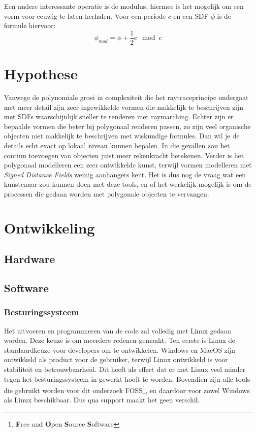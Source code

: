 \documentclass[12pt, a4paper]{article}
\begin{document}
Een andere interessante operatie is de modulus, hiermee is het mogelijk om een vorm voor eeuwig te laten herhalen. Voor een periode $c$ en een SDF $\phi$ is de formule hiervoor:
\[\phi_{mod}= \phi +\frac{1}{2}c\mod{c}\]

\clearpage
\section{Hypothese}
Vanwege de polynomiale groei in complexiteit die het raytraceprincipe ondergaat met meer detail zijn zeer ingewikkelde vormen die makkelijk te beschrijven zijn met SDFs waarschijnlijk sneller te renderen met raymarching. Echter zijn er bepaalde vormen die beter bij polygonaal renderen passen, zo zijn veel organische objecten niet makkelijk te beschrijven met wiskundige formules. Dan wil je de details echt exact op lokaal niveau kunnen bepalen. In die gevallen zou het continu toevoegen van objecten juist meer rekenkracht betekenen. Verder is het polygonaal modelleren een zeer ontwikkelde kunst, terwijl vormen modelleren met \emph{Signed Distance Fields} weinig aanhangers kent. Het is dus nog de vraag wat een kunstenaar zou kunnen doen met deze tools, en of het werkelijk mogelijk is om de processen die gedaan worden met polygonale objecten te vervangen.
\clearpage
\section{Ontwikkeling}
\subsection{Hardware}
\subsection{Software}
\subsubsection{Besturingssysteem}
Het uitvoeren en programmeren van de code zal volledig met Linux gedaan worden. Deze keuze is om meerdere redenen gemaakt. Ten eerste is Linux de standaardkeuze voor developers om te ontwikkelen. Windows en MacOS zijn ontwikkeld als product voor de gebruiker, terwijl Linux ontwikkeld is voor stabiliteit en betrouwbaarheid. Dit heeft als effect dat er met Linux veel minder tegen het besturingssysteem in gewerkt hoeft te worden. Bovendien zijn alle tools die gebruikt worden voor dit onderzoek FOSS\footnote{\textbf{F}ree and \textbf{O}pen \textbf{S}ource \textbf{S}oftware}, en daardoor voor zowel Windows als Linux beschikbaar. Dus qua support maakt het geen verschil.
\end{document}
